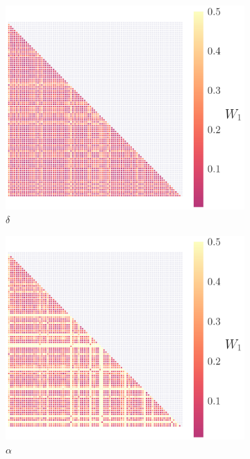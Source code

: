 \documentclass[fleqn,usenatbib,useAMS]{mnras}
\begin{document}
\begin{figure}
\begin{subfigure}[b]{0.3\textwidth}
		\includegraphics[width=\textwidth]{images/WD_4}
		\caption{$\delta$}
	\end{subfigure}
	\hfill	
	\begin{subfigure}[b]{0.3\textwidth}
		\includegraphics[width=\textwidth]{images/WD_5}
		\caption{$\alpha$}
	\end{subfigure}
	\hfill	
	\begin{subfigure}[b]{0.3\textwidth}

\end{subfigure}
\end{figure}
\end{document}
